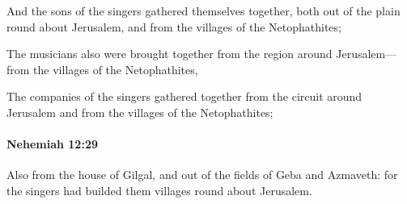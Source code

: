 			\begin{versebox}
					\item[BHS] 
					\item[LXX] 
					\item[ASV] And the sons of the singers gathered themselves together, both out of the plain round about Jerusalem, and from the villages of the Netophathites;
					\item[NIV] The musicians also were brought together from the region around Jerusalem—from the villages of the Netophathites,
					\item[NRSV] The companies of the singers gathered together from the circuit around Jerusalem and from the villages of the Netophathites;
			\end{versebox}

		\paragraph{Nehemiah 12:29} %
			\label{NEHEMIAH-12-29}

			Also from the house of Gilgal, and out of the fields of Geba and Azmaveth: for the singers had builded them villages round about Jerusalem.

